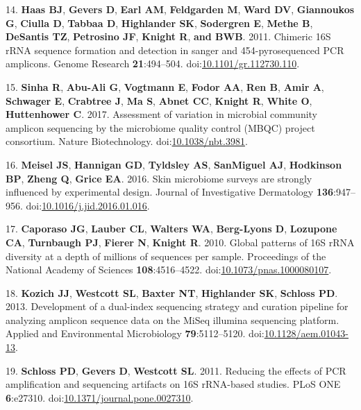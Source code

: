 \documentclass[11pt,]{article}
\begin{document}
\leavevmode\hypertarget{ref-Haas2011}{}%
14. \textbf{Haas BJ}, \textbf{Gevers D}, \textbf{Earl AM},
\textbf{Feldgarden M}, \textbf{Ward DV}, \textbf{Giannoukos G},
\textbf{Ciulla D}, \textbf{Tabbaa D}, \textbf{Highlander SK},
\textbf{Sodergren E}, \textbf{Methe B}, \textbf{DeSantis TZ},
\textbf{Petrosino JF}, \textbf{Knight R}, \textbf{and BWB}. 2011.
Chimeric 16S rRNA sequence formation and detection in sanger and
454-pyrosequenced PCR amplicons. Genome Research \textbf{21}:494--504.
doi:\href{https://doi.org/10.1101/gr.112730.110}{10.1101/gr.112730.110}.

\leavevmode\hypertarget{ref-Sinha2017}{}%
15. \textbf{Sinha R}, \textbf{Abu-Ali G}, \textbf{Vogtmann E},
\textbf{Fodor AA}, \textbf{Ren B}, \textbf{Amir A}, \textbf{Schwager E},
\textbf{Crabtree J}, \textbf{Ma S}, \textbf{Abnet CC}, \textbf{Knight
R}, \textbf{White O}, \textbf{Huttenhower C}. 2017. Assessment of
variation in microbial community amplicon sequencing by the microbiome
quality control (MBQC) project consortium. Nature Biotechnology.
doi:\href{https://doi.org/10.1038/nbt.3981}{10.1038/nbt.3981}.

\leavevmode\hypertarget{ref-Meisel2016}{}%
16. \textbf{Meisel JS}, \textbf{Hannigan GD}, \textbf{Tyldsley AS},
\textbf{SanMiguel AJ}, \textbf{Hodkinson BP}, \textbf{Zheng Q},
\textbf{Grice EA}. 2016. Skin microbiome surveys are strongly influenced
by experimental design. Journal of Investigative Dermatology
\textbf{136}:947--956.
doi:\href{https://doi.org/10.1016/j.jid.2016.01.016}{10.1016/j.jid.2016.01.016}.

\leavevmode\hypertarget{ref-Caporaso2010}{}%
17. \textbf{Caporaso JG}, \textbf{Lauber CL}, \textbf{Walters WA},
\textbf{Berg-Lyons D}, \textbf{Lozupone CA}, \textbf{Turnbaugh PJ},
\textbf{Fierer N}, \textbf{Knight R}. 2010. Global patterns of 16S rRNA
diversity at a depth of millions of sequences per sample. Proceedings of
the National Academy of Sciences \textbf{108}:4516--4522.
doi:\href{https://doi.org/10.1073/pnas.1000080107}{10.1073/pnas.1000080107}.

\leavevmode\hypertarget{ref-Kozich2013}{}%
18. \textbf{Kozich JJ}, \textbf{Westcott SL}, \textbf{Baxter NT},
\textbf{Highlander SK}, \textbf{Schloss PD}. 2013. Development of a
dual-index sequencing strategy and curation pipeline for analyzing
amplicon sequence data on the MiSeq illumina sequencing platform.
Applied and Environmental Microbiology \textbf{79}:5112--5120.
doi:\href{https://doi.org/10.1128/aem.01043-13}{10.1128/aem.01043-13}.

\leavevmode\hypertarget{ref-Schloss2011}{}%
19. \textbf{Schloss PD}, \textbf{Gevers D}, \textbf{Westcott SL}. 2011.
Reducing the effects of PCR amplification and sequencing artifacts on
16S rRNA-based studies. PLoS ONE \textbf{6}:e27310.
doi:\href{https://doi.org/10.1371/journal.pone.0027310}{10.1371/journal.pone.0027310}.
\end{document}
